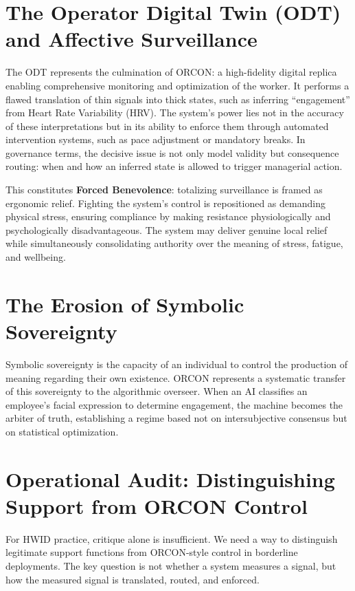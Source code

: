 \documentclass[11pt, a4paper]{article}
\begin{document}
\section{The Operator Digital Twin (ODT) and Affective Surveillance}

The ODT represents the culmination of ORCON: a high-fidelity digital replica enabling comprehensive monitoring and optimization of the worker. It performs a flawed translation of thin signals into thick states, such as inferring ``engagement'' from Heart Rate Variability (HRV). The system's power lies not in the accuracy of these interpretations but in its ability to enforce them through automated intervention systems, such as pace adjustment or mandatory breaks. In governance terms, the decisive issue is not only model validity but consequence routing: when and how an inferred state is allowed to trigger managerial action.

This constitutes \textbf{Forced Benevolence}: totalizing surveillance is framed as ergonomic relief. Fighting the system's control is repositioned as demanding physical stress, ensuring compliance by making resistance physiologically and psychologically disadvantageous. The system may deliver genuine local relief while simultaneously consolidating authority over the meaning of stress, fatigue, and wellbeing.

\section{The Erosion of Symbolic Sovereignty}

Symbolic sovereignty is the capacity of an individual to control the production of meaning regarding their own existence. ORCON represents a systematic transfer of this sovereignty to the algorithmic overseer. When an AI classifies an employee's facial expression to determine engagement, the machine becomes the arbiter of truth, establishing a regime based not on intersubjective consensus but on statistical optimization.

\section{Operational Audit: Distinguishing Support from ORCON Control}

For HWID practice, critique alone is insufficient. We need a way to distinguish legitimate support functions from ORCON-style control in borderline deployments. The key question is not whether a system measures a signal, but how the measured signal is translated, routed, and enforced.
\end{document}
